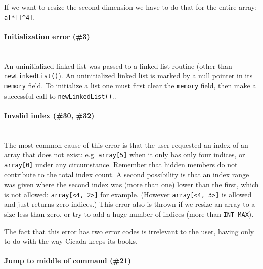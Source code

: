 \documentclass{article}
\begin{document}
\noindent If we want to resize the second dimension we have to do that for the entire array:  \verb#a[*][^4]#.\\




\paragraph{Initialization error (\#3)\\\\}

An uninitialized linked list was passed to a linked list routine (other than \texttt{newLinkedList()}).  An uninitialized linked list is marked by a null pointer in its \texttt{memory} field.  To initialize a list one must first clear the \verb#memory# field, then make a successful call to \texttt{newLinkedList()}..\\




\paragraph{Invalid index (\#30, \#32)\\\\}

The most common cause of this error is that the user requested an index of an array that does not exist:  e.g. \verb#array[5]# when it only has only four indices, or \verb#array[0]# under any circumstance.  Remember that hidden members do not contribute to the total index count.  A second possibility is that an index range was given where the second index was (more than one) lower than the first, which is not allowed:  \verb#array[<4, 2>]# for example.  (However \verb#array[<4, 3>]# is allowed and just returns zero indices.)  This error also is thrown if we resize an array to a size less than zero, or try to add a huge number of indices (more than \verb#INT_MAX#).

The fact that this error has two error codes is irrelevant to the user, having only to do with the way Cicada keeps its books.\\




\paragraph{Jump to middle of command (\#21)\\\\}
\end{document}
